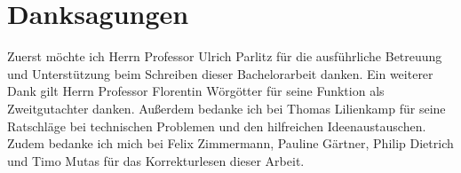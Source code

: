 \chapter{Danksagungen}
Zuerst möchte ich Herrn Professor Ulrich Parlitz für die ausführliche Betreuung und Unterstützung beim Schreiben dieser Bachelorarbeit danken. Ein weiterer Dank gilt Herrn Professor Florentin Wörgötter für seine Funktion als Zweitgutachter danken. Außerdem bedanke ich bei Thomas Lilienkamp für seine Ratschläge bei technischen Problemen und den hilfreichen Ideenaustauschen. Zudem bedanke ich mich bei Felix Zimmermann, Pauline Gärtner, Philip Dietrich und Timo Mutas für das Korrekturlesen dieser Arbeit. 